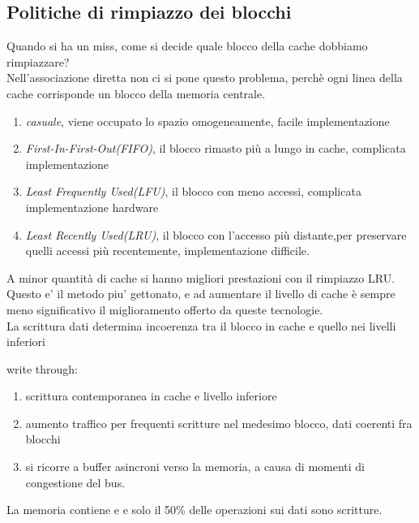 \documentclass[arch.tex]{subfiles}
\begin{document}
\subsection{Politiche di rimpiazzo dei blocchi}
Quando si ha un miss, come si decide quale blocco della cache dobbiamo rimpiazzare?\\
Nell'associazione diretta non ci si pone questo problema, perchè ogni linea della 
cache corrisponde un blocco della memoria centrale.
\begin{enumerate}
	\item \textit{casuale}, viene occupato lo spazio omogeneamente, 
		facile implementazione
	\item \textit{First-In-First-Out(FIFO)}, il blocco rimasto più a 
		lungo in cache, complicata implementazione
	\item \textit{Least Frequently Used(LFU)}, il blocco con meno accessi, 
		complicata implementazione hardware
	\item \textit{Least Recently Used(LRU)}, il blocco con 
		l'accesso più distante,per preservare quelli accessi 
		più recentemente, implementazione difficile.
\end{enumerate}
A minor quantità di cache si hanno migliori prestazioni con il rimpiazzo LRU.\\
Questo e' il metodo piu' gettonato, e ad aumentare il livello di cache 
è sempre meno significativo il miglioramento offerto da queste tecnologie.\\
La scrittura dati determina incoerenza tra il blocco in cache e quello nei 
livelli inferiori


\begin{defn}
write through:

\begin{enumerate}
	\item scrittura contemporanea in cache e livello inferiore
	\item aumento traffico per frequenti scritture nel medesimo blocco,
		dati coerenti fra blocchi
	\item si ricorre a buffer asincroni verso la memoria, a
		causa di momenti di congestione del bus.
\end{enumerate}
\end{defn}
La memoria contiene  e  e solo il 50\% delle operazioni
sui dati sono scritture.
\end{document}
